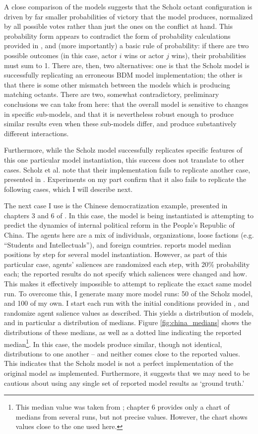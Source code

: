 A close comparison of the models suggests that the Scholz octant configuration is driven by far smaller probabilities of victory that the model produces, normalized by all possible votes rather than just the ones on the conflict at hand. This probability form appears to contradict the form of probability calculations provided in \citet{bdm_1997,bdm_2002}, and (more importantly) a basic rule of probability: if there are two possible outcomes (in this case, actor $i$ wins or actor $j$ wins), their probabilities must sum to 1. There are, then, two alternatives: one is that the Scholz model is successfully replicating an erroneous BDM model implementation; the other is that there is some other mismatch between the models which is producing matching octants. There are two, somewhat contradictory, preliminary conclusions we can take from here: that the overall model is sensitive to changes in specific sub-models, and that it is nevertheless robust enough to produce similar results even when these sub-models differ, and produce substantively different interactions.

Furthermore, while the Scholz model successfully replicates specific features of this one particular model instantiation, this success does not translate to other cases. Scholz et al. note that their implementation fails to replicate another case, presented in \citet{bdm_1997}. Experiments on my part confirm that it also fails to replicate the following cases, which I will describe next.

The next case I use is the Chinese democratization example, presented in chapters 3 and 6 of \citet{bdm_2002}. In this case, the model is being instantiated is attempting to predict the dynamics of internal political reform in the People's Republic of China. The agents here are a mix of individuals, organizations, loose factions (e.g. ``Students and Intellectuals''), and foreign countries. \citet{bdm_2002} reports model median positions by step for several model instantiation. However, as part of this particular case, agents' saliences are randomized each step, with 20\% probability each; the reported results do not specify which saliences were changed and how. This makes it effectively impossible to attempt to replicate the exact same model run. To overcome this, I generate many more model runs: 50 of the Scholz model, and 100 of my own. I start each run with the initial conditions provided in \citet{bdm_2002}, and randomize agent salience values as described. This yields a distribution of models, and in particular a distribution of medians. Figure \ref{fig:china_medians} shows the distributions of these medians, as well as a dotted line indicating the reported median\footnote{This median value was taken from \citet[chapter 3]{bdm_2002}; chapter 6 provides only a chart of medians from several runs, but not precise values. However, the chart shows values close to the one used here.}. In this case, the models produce similar, though not identical, distributions to one another -- and neither comes close to the reported values. This indicates that the Scholz model is not a perfect implementation of the original model as implemented. Furthermore, it suggests that we may need to be cautious about using any single set of reported model results as `ground truth.'

